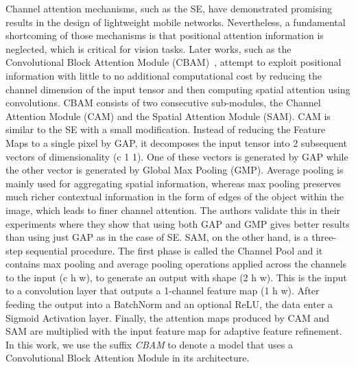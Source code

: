 \documentclass[journal]{IEEEtran}
\begin{document}
Channel attention mechanisms, such as the SE, have demonstrated promising results in the design of lightweight mobile networks. Nevertheless, a fundamental shortcoming of those mechanisms is that positional attention information is neglected, which is critical for vision tasks. Later works, such as the Convolutional Block Attention Module (CBAM)~\cite{Woo_2018_ECCV}, attempt to exploit positional information with little to no additional computational cost by reducing the channel dimension of the input tensor and then computing spatial attention using convolutions. CBAM consists of two consecutive sub-modules, the Channel Attention Module (CAM) and the Spatial Attention Module (SAM). CAM is similar to the SE with a small modification. Instead of reducing the Feature Maps to a single pixel by GAP, it decomposes the input tensor into 2 subsequent vectors of dimensionality (c  1  1). One of these vectors is generated by GAP while the other vector is generated by Global Max Pooling (GMP). Average pooling is mainly used for aggregating spatial information, whereas max pooling preserves much richer contextual information in the form of edges of the object within the image, which leads to finer channel attention. The authors validate this in their experiments where they show that using both GAP and GMP gives better results than using just GAP as in the case of SE. SAM, on the other hand, is a three-step sequential procedure. The first phase is called the Channel Pool and it contains max pooling and average pooling operations applied across the channels to the input (c  h  w), to generate an output with shape (2  h  w). This is the input to a convolution layer that outputs a 1-channel feature map (1  h  w). After feeding the output into a BatchNorm and an optional ReLU, the data enter a Sigmoid Activation layer. Finally, the attention maps produced by CAM and SAM are multiplied with the input feature map for adaptive feature refinement. In this work, we use the suffix \textit{CBAM} to denote a model that uses a Convolutional Block Attention Module in its architecture.
\end{document}

